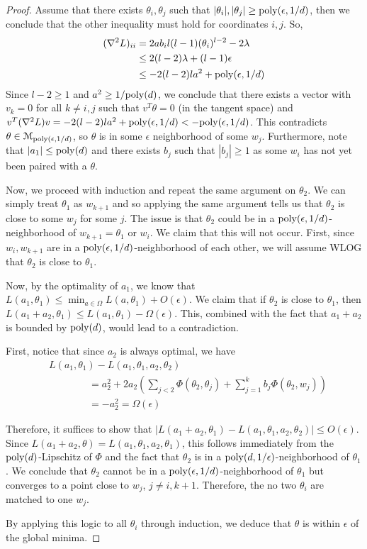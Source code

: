 \begin{proof}
Assume that there exists $\theta_i, \theta_j$ such that $|\theta_i|,|\theta_j| \geq \mathrm{poly}(\epsilon,1/d)$, then we conclude that the other inequality must hold for coordinates $i, j$. So,
%
\begin{align*}
(\nabla^2 L)_{ii} & = 2a b_i l(l-1)(\theta_i)^{l-2} - 2 \lambda \\
& \leq
  2(l-2)\lambda + (l-1)\epsilon \\
&  \leq -2(l-2)la^2 + \mathrm{poly}(\epsilon,1/d)
\end{align*}
%
Since $l-2 \geq 1$ and $a^2 \geq 1/\mathrm{poly}(d)$, we conclude that there
exists a vector with $v_k = 0$ for all $k\neq i, j$ such that
$v^T\theta = 0$ (in the tangent space) and
$v^T(\nabla^2 L) v = -2(l-2)l a^2 + \mathrm{poly}(\epsilon,1/d) <
-\mathrm{poly}(\epsilon,1/d)$.
This contradicts $\theta \in \mathcal{M}_{\mathrm{poly}(\epsilon,1/d)}$, so
$\theta$ is in some $\epsilon$ neighborhood of some
$w_j$. Furthermore, note that $|a_1| \leq \mathrm{poly}(d)$ and there exists
$b_j$ such that $|b_j| \geq 1$ as some $w_i$ has not yet been paired
with a $\theta$.

Now, we proceed with induction and repeat the same argument on $\theta_2$. We can simply treat $\theta_1$ as $w_{k+1}$ and so applying the same argument tells us that $\theta_2$ is close to some $w_j$ for some $j$. The issue is that $\theta_2$ could be in a $\mathrm{poly}(\epsilon,1/d)$-neighborhood of $w_{k+1} = \theta_1$ or $w_i$. We claim that this will not occur. First, since $w_i, w_{k+1}$ are in a $\mathrm{poly}(\epsilon,1/d)$-neighborhood of each other, we will assume WLOG that $\theta_2$ is close to $\theta_1$.

Now, by the optimality of $a_1$, we know that $L(a_1,\theta_1) \leq \min_{a \in \Omega} L(a,\theta_1) + O(\epsilon)$. We claim that if $\theta_2$ is close to $\theta_1$, then $L(a_1+a_2,\theta_1) \leq L(a_1,\theta_1) - \Omega(\epsilon)$. This, combined with the fact that $a_1 + a_2$ is bounded by $\mathrm{poly}(d)$, would lead to a contradiction.

First, notice that since $a_2$ is always optimal, we have
\begin{align*}
& L(a_1,\theta_1) - L(a_1,\theta_1,a_2,\theta_2) \\
& \qquad \qquad = a_2^2 + 2a_2 (\sum_{j < 2} \Phi(\theta_2,\theta_j) + \sum_{j=1}^k b_j \Phi(\theta_2,w_j)) \\
& \qquad \qquad = -a_2^2 = \Omega(\epsilon)
\end{align*}

Therefore, it suffices to show that $|L(a_1+a_2,\theta_1) - L(a_1,\theta_1,a_2,\theta_2) | \leq O(\epsilon)$. Since $L(a_1+a_2,\theta) = L(a_1,\theta_1,a_2,\theta_1)$, this follows immediately from the $\mathrm{poly}(d)$-Lipschitz of $\Phi$ and the fact that $\theta_2$ is in a $\mathrm{poly}(d,1/\epsilon)$-neighborhood of $\theta_1$. We conclude that $\theta_2$ cannot be in a $\mathrm{poly}(\epsilon,1/d)$-neighborhood of $\theta_1$ but converges to a point close to $w_{j}$, $j\neq i,k+1$. Therefore, the no two $\theta_i$ are matched to one $w_j$. 

By applying this logic to all $\theta_i$ through induction, we deduce that $\theta$ is within $\epsilon$ of the global minima.
\end{proof}

